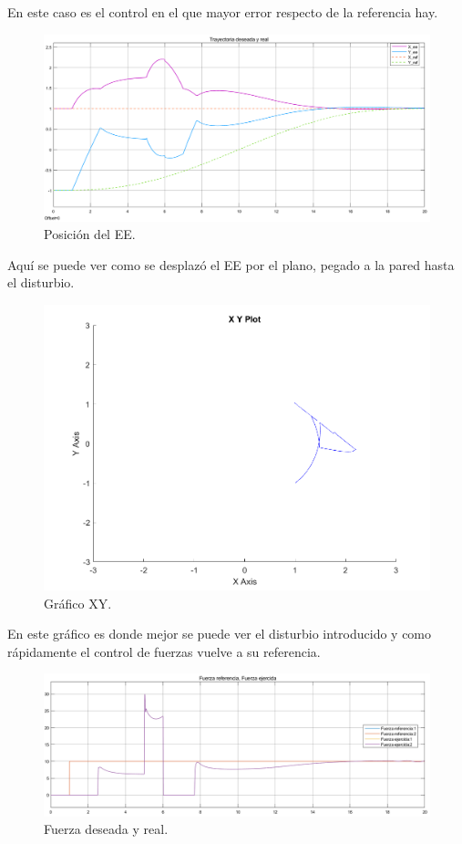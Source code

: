 En este caso es el control en el que mayor error respecto de la referencia hay.

\begin{figure}[H]
	\centering
	\includegraphics[width=0.8\linewidth]{ImagenesControl híbrido no lineal/3_3_f_b}
	\caption{Posición del EE.}	
	\label{fig:cposd}
\end{figure}

Aquí se puede ver como se desplazó el EE por el plano, pegado a la pared hasta el disturbio.
\begin{figure}[H]
	\centering
	\includegraphics[width=0.5\linewidth]{ImagenesControl híbrido no lineal/3_3_f_c}
	\caption{Gráfico XY.}	
	\label{fig:cxyd}
\end{figure}

En este gráfico es donde mejor se puede ver el disturbio introducido y como rápidamente el control de fuerzas vuelve a su referencia.

\begin{figure}[H]
	\centering
	\includegraphics[width=0.8\linewidth]{ImagenesControl híbrido no lineal/3_3_f_e}
	\caption{Fuerza deseada y real.}	
	\label{fig:cfd}
\end{figure}
%